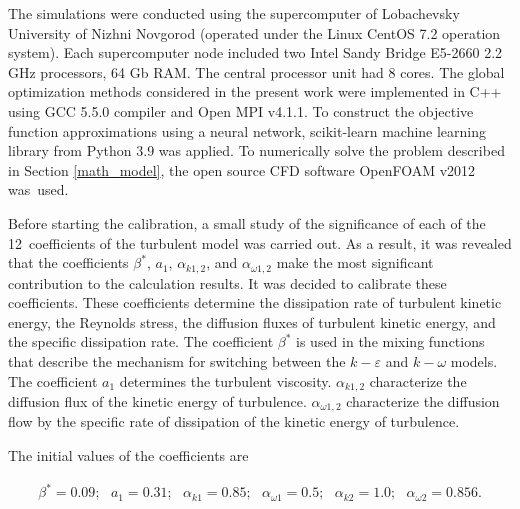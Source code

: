 \documentclass[mathematics,article,accept,pdftex,moreauthors]{Definitions/mdpi}
\begin{document}
The simulations were conducted using the supercomputer of Lobachevsky University of Nizhni Novgorod (operated under the Linux CentOS 7.2 operation system). Each supercomputer node included two Intel Sandy Bridge E5-2660 2.2 GHz processors, 64 Gb RAM. The central processor unit had 8 cores. 
The global optimization methods considered in the present work were implemented in C++ using GCC 5.5.0 compiler and Open MPI v4.1.1. To construct the objective function approximations using a neural network, scikit-learn machine learning library from Python 3.9 was applied. 
To numerically solve the problem described in Section \ref{math_model}, the open source CFD software OpenFOAM v2012~\cite{OpenFOAM} was~used.

Before starting the calibration, a small study of the significance of each of the 12~coefficients of the turbulent model was carried out. As a result, it was revealed that the coefficients $\beta^*$, $a_1$, $\alpha_{k 1,2}$, and $\alpha_{\omega 1,2}$ make the most significant contribution to the calculation results. It was decided to calibrate these coefficients. These coefficients determine the dissipation rate of turbulent kinetic energy, the Reynolds stress, the diffusion fluxes of turbulent kinetic energy, and the specific dissipation rate. The coefficient $\beta^*$ is used in the mixing functions that describe the mechanism for switching between the $k-\varepsilon$ and $k-\omega$ models. The coefficient $a_1$ determines the turbulent viscosity. $\alpha_{k 1,2}$ characterize the diffusion flux of the kinetic energy of turbulence. $\alpha_{\omega 1,2}$ characterize the diffusion flow by the specific rate of dissipation of the kinetic energy of turbulence.

The initial values of the coefficients are 
\begin{linenomath}
\begin{equation}
	\begin{aligned}
		\beta^* = 0.09;\ \ \ a_1 = 0.31;\ \ \ \alpha_{k 1} = 0.85;\ \ \ \alpha_{\omega 1} = 0.5; \ \ \ \alpha_{k 2} = 1.0;\ \ \ \alpha_{\omega 2} = 0.856.
	\end{aligned}
\end{equation}
\end{linenomath}
\end{document}
